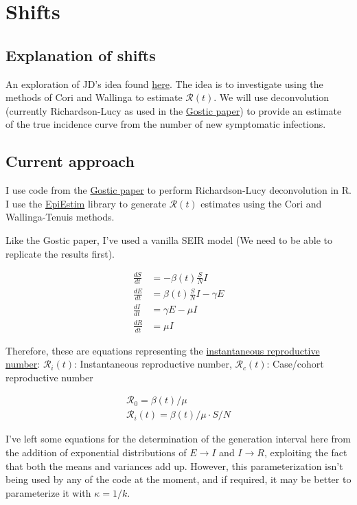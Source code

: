 \documentclass{article}
\begin{document}
\clearpage


\section{Shifts}
\subsection{Explanation of shifts}
An exploration of JD's idea found  \href{http://dushoff.github.io/notebook/shifts.html}{here}. The idea is to investigate using the methods of Cori and Wallinga to estimate $\mathscr{R}(t)$. We will use deconvolution (currently Richardson-Lucy as used in the \href{https://www.medrxiv.org/content/10.1101/2020.06.18.20134858v3}{Gostic paper}) to provide an estimate of the true incidence curve from the number of new symptomatic infections. 

\subsection{Current approach}
I use code from the \href{https://github.com/cobeylab/Rt_estimation}{Gostic paper} to perform Richardson-Lucy deconvolution in R. I use the \href{https://cran.r-project.org/web/packages/EpiEstim/index.html}{EpiEstim} library to generate $\mathscr{R}(t)$ estimates using the Cori and Wallinga-Tenuis methods. 

Like the Gostic paper, I've used a vanilla SEIR model (We need to be able to replicate the results first).

\begin{align}
\frac{dS}{dt} &= -\beta(t) \frac{S}{N}  I \\ 
\frac{dE}{dt} &= \beta(t) \frac{S}{N} I - \gamma E \\
\frac{dI}{dt} &= \gamma E - \mu I \\ 
\frac{dR}{dt} &= \mu I  
\end{align}

Therefore, these are equations representing the \href{https://www.ncbi.nlm.nih.gov/pmc/articles/PMC3935673/}{instantaneous reproductive number}:
$\mathscr{R}_{i}(t)$: Instantaneous reproductive number, $\mathscr{R}_{c}(t)$: Case/cohort reproductive number

\begin{align}
    \mathscr{R}_0 = \beta(t)/\mu \\
    \mathscr{R}_{i}(t) = \beta(t)/\mu \cdot S/N
\end{align}

I've left some equations for the determination of the generation interval here from the addition of exponential distributions of $E \xrightarrow{}I$ and $I \xrightarrow{} R$, exploiting the fact that both the means and variances add up. However, this parameterization isn't being used by any of the code at the moment, and if required, it may be better to parameterize it with $\kappa = 1/k$.
\end{document}
